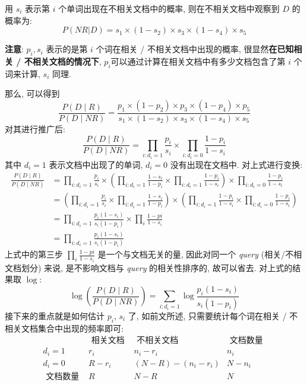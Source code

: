 用 $s_i$ 表示第 $i$ 个单词出现在不相关文档中的概率, 则在不相关文档中观察到 $D$ 的概率为:
$$
P(NR|D) = s_1 \times (1-s_2) \times s_3 \times (1-s_4) \times s_5
$$

\textbf{注意}: $p_i, s_i$ 表示的是第 $i$ 个词在相关 / 不相关文档中出现的概率, 很显然\textbf{在已知相关 / 不相关文档的情况下}, $p_i$可以通过计算在相关文档中有多少文档包含了第 $i$ 个词来计算, $s_i$ 同理.

那么, 可以得到
$$
\frac{P(D \mid R)}{P(D \mid N R)}=\frac{p_{1} \times\left(1-p_{2}\right) \times p_{3} \times\left(1-p_{4}\right) \times p_{5}}{s_{1} \times\left(1-s_{2}\right) \times s_{3} \times\left(1-s_{4}\right) \times s_{5}}
$$
对其进行推广后:
$$
\frac{P(D \mid R)}{P(D \mid N R)}=\prod_{i: d_{i}=1} \frac{p_{i}}{s_{i}} \times \prod_{i: d_{i}=0} \frac{1-p_{i}}{1-s_{i}}
$$
其中 $d_i=1$ 表示文档中出现了的单词, $d_i=0$ 没有出现在文档中. 对上式进行变换:
$$
\begin{aligned}
	\frac{P(D \mid R)}{P(D \mid N R)} &=\prod_{i: d_{i}=1} \frac{p_{i}}{s_{i}} \times\left(\prod_{i: d_{i}=1} \frac{1-s_{i}}{1-p_{i}} \times \prod_{i: d_{i}=1} \frac{1-p_{i}}{1-s_{i}}\right) \times \prod_{i: d_{i}=0} \frac{1-p_{i}}{1-s_{i}} \\
	&=\left(\prod_{i: d_{i}=1} \frac{p_{i}}{s_{i}} \times \prod_{i: d_{i}=1} \frac{1-s_{i}}{1-p_{i}}\right) \times\left(\prod_{i: d_{i}=1} \frac{1-p_{i}}{1-s_{i}} \times \prod_{i: d_{i}=0} \frac{1-p_{i}}{1-s_{i}}\right) \\
	&=\prod_{i: d_{i}=1} \frac{p_{i}\left(1-s_{i}\right)}{s_{i}\left(1-p_{i}\right)} \times \prod_{i} \frac{1-p i}{1-s_{i}} \\
	&=\prod_{i: d_{i}=1} \frac{p_{i}\left(1-s_{i}\right)}{s_{i}\left(1-p_{i}\right)}
\end{aligned}
$$
上式中的第三步 $\prod_{i} \frac{1-p i}{1-s_{i}}$ 是一个与文档无关的量, 因此对同一个 \textit{query} (相关/不相文档划分) 来说, 是不影响文档与 \textit{query} 的相关性排序的, 故可以省去. 对上式的结果取 $\log$:
$$
\log \left(\frac{P(D \mid R)}{P(D \mid N R)}\right)=\sum_{i: d_{i}=1} \log \frac{p_{i}\left(1-s_{i}\right)}{s_{i}\left(1-p_{i}\right)}
$$
接下来的重点就是如何估计 $p_i$, $s_i$ 了, 如前文所述, 只需要统计每个词在相关 / 不相关文档集合中出现的频率即可:
$$
\begin{array}{llll} 
	& \text { 相关文档 } & \text { 不相关文档 } & \text { 文档数量 } \\
	\hline d_{i}=1 & r_{i} & n_{i}-r_{i} & n_{i} \\
	d_{i}=0 & R-r_{i} & (N-R)-\left(n_{i}-r_{i}\right) & N-n_{i} \\
	\hline \text { 文档数量 } & R & N-R & N
\end{array}
$$
